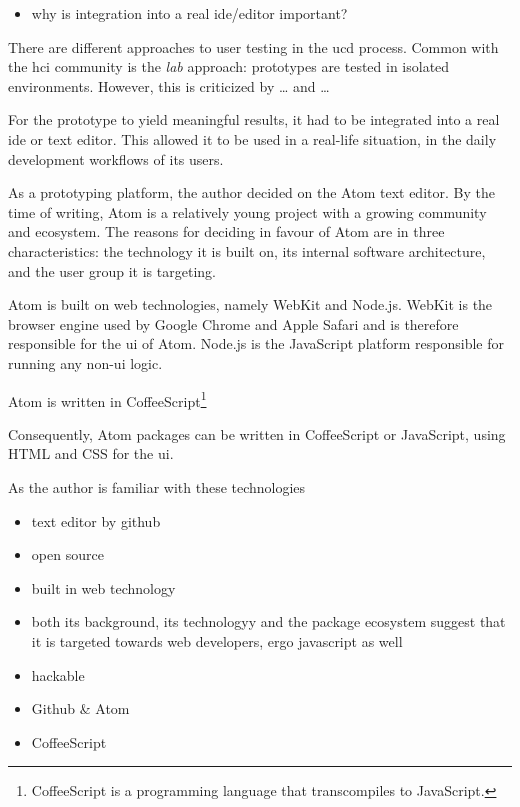 \begin{itemize}
\itemsep1pt\parskip0pt
\item
  why is integration into a real ide/editor important?
\end{itemize}

There are different approaches to user testing in the \ac{ucd} process.
Common with the \ac{hci} community is the \emph{lab} approach:
prototypes are tested in isolated environments. However, this is
criticized by \ldots{} and \ldots{}

For the prototype to yield meaningful results, it had to be integrated
into a real \ac{ide} or text editor. This allowed it to be used in a
real-life situation, in the daily development workflows of its users.

As a prototyping platform, the author decided on the Atom text editor.
By the time of writing, Atom is a relatively young project with a
growing community and ecosystem. The reasons for deciding in favour of
Atom are in three characteristics: the technology it is built on, its
internal software architecture, and the user group it is targeting.

Atom is built on web technologies, namely WebKit and Node.js. WebKit is
the browser engine used by Google Chrome and Apple Safari and is
therefore responsible for the \acl{ui} of Atom. Node.js is the
JavaScript platform responsible for running any non-\ac{ui} logic.

Atom is written in
CoffeeScript\footnote{CoffeeScript is a programming language that transcompiles to JavaScript.}

Consequently, Atom packages can be written in CoffeeScript or
JavaScript, using HTML and CSS for the \ac{ui}.

As the author is familiar with these technologies

\begin{itemize}
\item
  text editor by github
\item
  open source
\item
  built in web technology
\item
  both its background, its technologyy and the package ecosystem suggest
  that it is targeted towards web developers, ergo javascript as well
\item
  hackable
\item
  Github \& Atom
\item
  CoffeeScript
\end{itemize}

